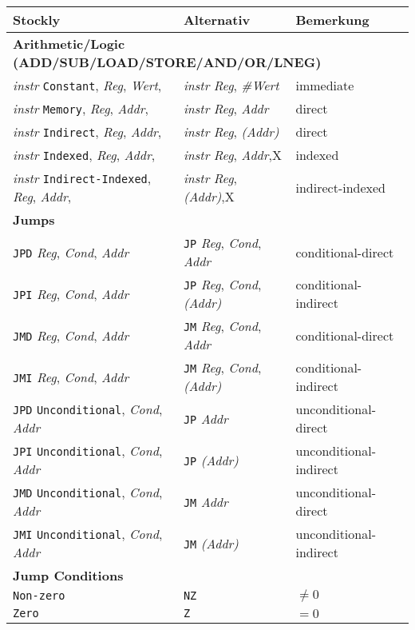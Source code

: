 \documentclass[12pt,twoside]{report}
\begin{document}
\hfuzz=60pt
\begin{center}\begin{longtable}{|l|l|l|}
\hline
Stockly & Alternativ & Bemerkung \\
\hline
\hline
\endhead
\multicolumn{3}{|l|}{\bf Arithmetic/Logic (ADD/SUB/LOAD/STORE/AND/OR/LNEG)} \\
\hline
{\it instr} {\tt Constant}, {\it Reg}, {\it Wert}, & {\it instr} {\it Reg}, {\it \#Wert} & immediate \\
{\it instr} {\tt Memory}, {\it Reg}, {\it Addr}, & {\it instr} {\it Reg}, {\it Addr} & direct \\
{\it instr} {\tt Indirect}, {\it Reg}, {\it Addr}, & {\it instr} {\it Reg}, {\it (Addr)} & direct \\
{\it instr} {\tt Indexed}, {\it Reg}, {\it Addr}, & {\it instr} {\it Reg}, {\it Addr},X & indexed \\
{\it instr} {\tt Indirect-Indexed}, {\it Reg}, {\it Addr}, & {\it instr} {\it Reg}, {\it (Addr)},X & indirect-indexed \\
\hline
\multicolumn{3}{|l|}{\bf Jumps} \\
\hline
{\tt JPD} {\it Reg}, {\it Cond}, {\it Addr} & {\tt JP} {\it Reg}, {\it Cond}, {\it Addr} & conditional-direct \\
{\tt JPI} {\it Reg}, {\it Cond}, {\it Addr} & {\tt JP} {\it Reg}, {\it Cond}, {\it (Addr)} & conditional-indirect \\
{\tt JMD} {\it Reg}, {\it Cond}, {\it Addr} & {\tt JM} {\it Reg}, {\it Cond}, {\it Addr} & conditional-direct \\
{\tt JMI} {\it Reg}, {\it Cond}, {\it Addr} & {\tt JM} {\it Reg}, {\it Cond}, {\it (Addr)} & conditional-indirect \\
{\tt JPD} {\tt Unconditional}, {\it Cond}, {\it Addr} & {\tt JP} {\it Addr} & unconditional-direct \\
{\tt JPI} {\tt Unconditional}, {\it Cond}, {\it Addr} & {\tt JP} {\it (Addr)} & unconditional-indirect \\
{\tt JMD} {\tt Unconditional}, {\it Cond}, {\it Addr} & {\tt JM} {\it Addr} & unconditional-direct \\
{\tt JMI} {\tt Unconditional}, {\it Cond}, {\it Addr} & {\tt JM} {\it (Addr)} & unconditional-indirect \\
\hline
\multicolumn{3}{|l|}{\bf Jump Conditions} \\
\hline
{\tt Non-zero} & {\tt NZ} & $\neq 0$ \\
{\tt Zero} & {\tt Z} & $= 0$ \\

\end{longtable}
\end{center}
\end{document}
